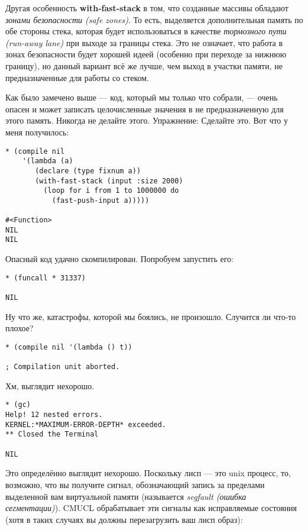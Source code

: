 Другая особенность \textbf{with-fast-stack} в том, что созданные массивы обладают \emph{зонами безопасности (safe zones)}. То есть, выделяется дополнительная память по обе стороны стека, которая будет использоваться в качестве \emph{тормозного пути (run-away lane)} при выходе за границы стека. Это не означает, что работа в зонах безопасности будет хорошей идеей (особенно при переходе за нижнюю границу), но данный вариант всё же лучше, чем выход в участки памяти, не предназначенные для работы со стеком.

Как было замечено выше --- код, который мы только что собрали, --- очень опасен и может записать целочисленные значения в не предназначенную для этого память. Никогда не делайте этого. Упражнение: Сделайте это. Вот что у меня получилось:

\begin{verbatim}
* (compile nil
    '(lambda (a)
       (declare (type fixnum a))
       (with-fast-stack (input :size 2000)
         (loop for i from 1 to 1000000 do
           (fast-push-input a)))))

#<Function>
NIL
NIL
\end{verbatim}

Опасный код удачно скомпилирован. Попробуем запустить его:

\begin{verbatim}
* (funcall * 31337)

NIL
\end{verbatim}

Ну что же, катастрофы, которой мы боялись, не произошло. Случится ли что-то плохое?

\begin{verbatim}
* (compile nil '(lambda () t))

; Compilation unit aborted.
\end{verbatim}

Хм, выглядит нехорошо.

\begin{verbatim}
* (gc)
Help! 12 nested errors.
KERNEL:*MAXIMUM-ERROR-DEPTH* exceeded.
** Closed the Terminal

NIL
\end{verbatim}

Это определённо выглядит нехорошо. Поскольку лисп --- это unix процесс, то, возможно, что вы получите сигнал, обозначающий запись за пределами выделенной вам виртуальной памяти (называется \emph{seg\-fault (ошибка сегментации)}). CMUCL обрабатывает эти сигналы как исправляемые состояния (хотя в таких случаях вы должны перезагрузить ваш лисп образ):

